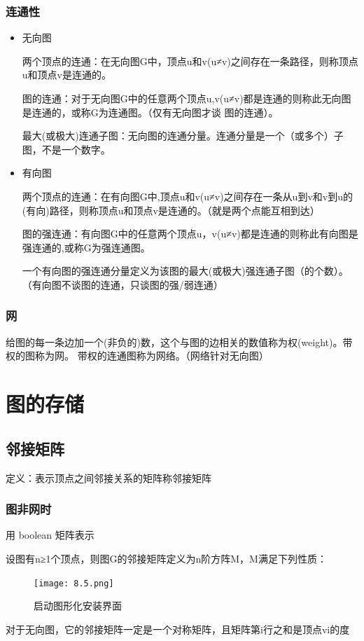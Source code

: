 \documentclass[AutoFakeBold]{LZUThesis2007}
\begin{document}
			\subsubsection{连通性}
\begin{itemize}
	\item 无向图

两个顶点的连通：在无向图G中，顶点u和v(u≠v)之间存在一条路径，则称顶点u和顶点v是连通的。

图的连通：对于无向图G中的任意两个顶点u,v(u≠v)都是连通的则称此无向图是连通的，或称G为连通图。（仅有无向图才谈 图的连通）。

最大(或极大)连通子图：无向图的连通分量。连通分量是一个（或多个）子图，不是一个数字。
	\item 有向图

两个顶点的连通：在有向图G中,顶点u和v(u≠v)之间存在一条从u到v和v到u的(有向)路径，则称顶点u和顶点v是连通的。（就是两个点能互相到达）

图的强连通：有向图G中的任意两个顶点u，v(u≠v)都是连通的则称此有向图是强连通的,或称G为强连通图。

一个有向图的强连通分量定义为该图的最大(或极大)强连通子图（的个数）。（有向图不谈图的连通，只谈图的强/弱连通）
\end{itemize}

			\subsubsection{网}
给图的每一条边加一个(非负的)数，这个与图的边相关的数值称为权(weight)。带权的图称为网。
带权的连通图称为网络。（网络针对无向图）

	\section{图的存储}			
		\subsection{邻接矩阵}
定义：表示顶点之间邻接关系的矩阵称邻接矩阵
			\subsubsection{图非网时}
用 boolean 矩阵表示

设图有n≥1个顶点，则图G的邻接矩阵定义为n阶方阵M，M满足下列性质：
\begin{figure}[H]
    \centering
    \texttt{[image: 8.5.png]}
    \caption{启动图形化安装界面}
    \label{fig_install_texlive}
\end{figure}
对于无向图，它的邻接矩阵一定是一个对称矩阵，且矩阵第i行之和是顶点vi的度
\end{document}
